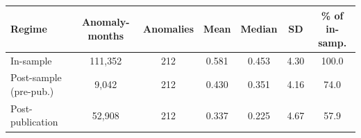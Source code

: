 \begin{tabular}{lcccccc}
\toprule
Regime & Anomaly-months & Anomalies & Mean & Median & SD & \% of in-samp. \\
\midrule
In-sample & 111,352 & 212 & 0.581 & 0.453 & 4.30 & 100.0 \\
Post-sample (pre-pub.) & 9,042 & 212 & 0.430 & 0.351 & 4.16 & 74.0 \\
Post-publication & 52,908 & 212 & 0.337 & 0.225 & 4.67 & 57.9 \\
\bottomrule
\end{tabular}